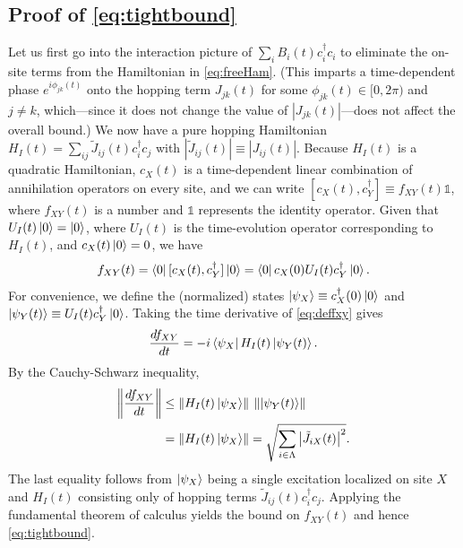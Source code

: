 \subsection{Proof of \cref{eq:tightbound}}
Let us first go into the interaction picture of $\sum_i B_{i}(t)c_i^\dagger c_i$ to eliminate the on-site terms from the Hamiltonian in \cref{eq:freeHam}.
(This imparts a time-dependent phase $e^{i\phi_{jk}(t)}$ onto the hopping term $J_{jk}(t)$ for some $\phi_{jk}(t)\in[0,2\pi)$ and $j\neq k$, which---since it does not change the value of $|J_{jk}(t)|$---does not affect the overall bound.)
We now have a pure hopping Hamiltonian $ H_I(t) = \sum_{ij} \tilde J_{ij}(t)c_i^\dagger c_j$ with $|\tilde J_{ij}(t)|\equiv|J_{ij}(t)|$.
Because $ H_I(t)$ is a quadratic Hamiltonian, $c_X(t)$ is a time-dependent linear combination of annihilation operators on every site, and we can write $[c_X(t), c^\dagger_Y] \equiv f_{XY}(t) \mathds{1}$, where $f_{XY}(t)$ is a number and $\mathds{1}$ represents the identity operator.
Given that $U_I(t)\left | 0 \right\rangle=\left | 0 \right\rangle$, where $U_I(t)$ is the time-evolution operator corresponding to $H_I(t)$, and $c_X(t)\left | 0 \right\rangle=0$, we have
\begin{equation}
	\label{eq:deffxy}
	f_{XY}(t) = \left \langle 0 \right |[c_X(t), c^\dagger_Y]\left | 0 \right\rangle = \left \langle 0 \right | c_X(0)U_I(t)c^\dagger_Y \left | 0 \right\rangle.
\end{equation}
For convenience, we define the (normalized) states $\left | \psi_X \right\rangle \equiv c^\dagger_X(0)\left | 0 \right\rangle$ and $\left | \psi_Y(t) \right\rangle \equiv U_I(t)c_Y^\dagger\left | 0 \right\rangle$. Taking the time derivative of \cref{eq:deffxy} gives
\begin{equation}
	\label{eq:onelineproof}
	\frac{df_{XY}}{dt} = -i\left \langle \psi_X \right | H_I(t)\left | \psi_Y(t) \right\rangle.
\end{equation}
By the Cauchy-Schwarz inequality,
\begin{align}
\left\Vert  \frac{df_{XY}}{dt}\right\Vert &\le \left\Vert H_I(t)\left | \psi_X \right\rangle \right \Vert \: \left\Vert \left | \psi_Y(t) \right\rangle \right \Vert\\
&=\left\Vert H_I(t)\left | \psi_X \right\rangle \right \Vert= \sqrt{\sum_{i\in\Lambda}\left| \tilde J_{iX}(t)\right|^{2}}.
\end{align}
The last equality follows from $\left | \psi_X \right\rangle$ being a single excitation localized on site $X$ and $ H_I(t)$ consisting only of hopping terms $\tilde J_{ij}(t)c_i^\dagger c_j$. Applying the fundamental theorem of calculus yields the bound on  $f_{XY}(t)$ and hence \cref{eq:tightbound}.

